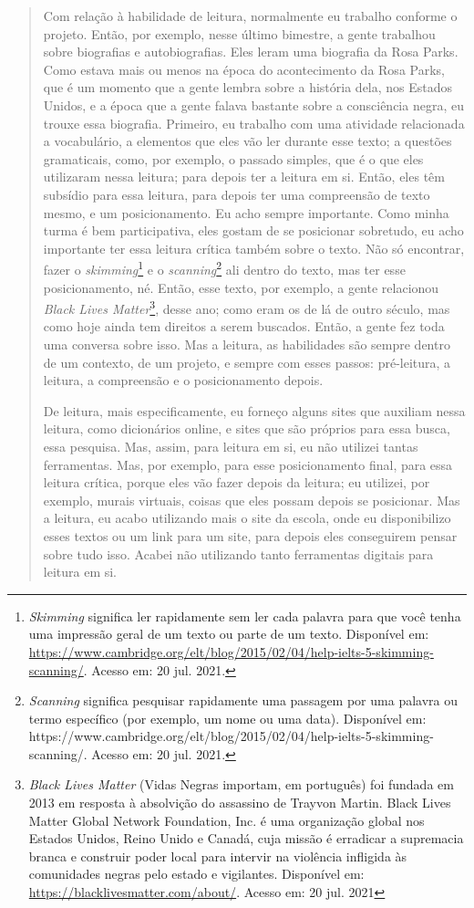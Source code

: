 \documentclass{textolivre}
\begin{document}
\begin{quote}
Com relação à habilidade de leitura, normalmente eu trabalho conforme o projeto. Então, por exemplo, nesse último bimestre, a gente trabalhou sobre biografias e autobiografias. Eles leram uma biografia da Rosa Parks. Como estava mais ou menos na época do acontecimento da Rosa Parks, que é um momento que a gente lembra sobre a história dela, nos Estados Unidos, e a época que a gente falava bastante sobre a consciência negra, eu trouxe essa biografia. Primeiro, eu trabalho com uma atividade relacionada a vocabulário, a elementos que eles vão ler durante esse texto; a questões gramaticais, como, por exemplo, o passado simples, que é o que eles utilizaram nessa leitura; para depois ter a leitura em si. Então, eles têm subsídio para essa leitura, para depois ter uma compreensão de texto mesmo, e um posicionamento. Eu acho sempre importante. Como minha turma é bem participativa, eles gostam de se posicionar sobretudo, eu acho importante ter essa leitura crítica também sobre o texto. Não só encontrar, fazer o \emph{skimming}\footnote{\emph{Skimming} significa ler rapidamente sem ler cada palavra para que você tenha uma impressão geral de um texto ou parte de um texto. Disponível em: \url{https://www.cambridge.org/elt/blog/2015/02/04/help-ielts-5-skimming-scanning/}. Acesso em: 20 jul. 2021.} e o \emph{scanning}\footnote{\emph{Scanning} significa pesquisar rapidamente uma passagem por uma palavra ou termo específico (por exemplo, um nome ou uma data). Disponível em: https://www.cambridge.org/elt/blog/2015/02/04/help-ielts-5-skimming-scanning/. Acesso em: 20 jul. 2021.} ali dentro do texto, mas ter esse posicionamento, né. Então, esse texto, por exemplo, a gente relacionou \emph{Black Lives Matter}\footnote{\emph{Black Lives Matter} (Vidas Negras importam, em português) foi fundada em 2013 em resposta à absolvição do assassino de Trayvon Martin. Black Lives Matter Global Network Foundation, Inc. é uma organização global nos Estados Unidos, Reino Unido e Canadá, cuja missão é erradicar a supremacia branca e construir poder local para intervir na violência infligida às comunidades negras pelo estado e vigilantes. Disponível em: \url{https://blacklivesmatter.com/about/}. Acesso em: 20 jul. 2021}, desse ano; como eram os de lá de outro século, mas como hoje ainda tem direitos a serem buscados. Então, a gente fez toda uma conversa sobre isso. Mas a leitura, as habilidades são sempre dentro de um contexto, de um projeto, e sempre com esses passos: pré-leitura, a leitura, a compreensão e o posicionamento depois.

De leitura, mais especificamente, eu forneço alguns sites que auxiliam nessa leitura, como dicionários online, e sites que são próprios para essa busca, essa pesquisa. Mas, assim, para leitura em si, eu não utilizei tantas ferramentas. Mas, por exemplo, para esse posicionamento final, para essa leitura crítica, porque eles vão fazer depois da leitura; eu utilizei, por exemplo, murais virtuais, coisas que eles possam depois se posicionar. Mas a leitura, eu acabo utilizando mais o site da escola, onde eu disponibilizo esses textos ou um link para um site, para depois eles conseguirem pensar sobre tudo isso. Acabei não utilizando tanto ferramentas digitais para leitura em si.


\end{quote}
\end{document}
